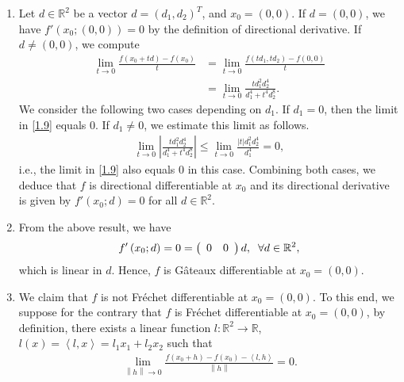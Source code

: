 \documentclass[a4paper]{article}
\numberwithin{equation}{section}
\begin{document}
\begin{enumerate}
\item Let $d\in \mathbb{R}^2$ be a vector $d=\left(d_1,d_2\right)^T$, and $x_0 =\left(0,0\right)$. If $d=\left(0,0\right)$, we have $f'\left( {{x_0};\left( {0,0} \right)} \right) = 0$ by the definition of directional derivative. If $d\ne \left(0,0\right)$, we compute
\begin{align}
\mathop {\lim }\limits_{t \to 0} \frac{{f\left( {{x_0} + td} \right) - f\left( {{x_0}} \right)}}{t} &= \mathop {\lim }\limits_{t \to 0} \frac{{f\left( {t{d_1},t{d_2}} \right) - f\left( {0,0} \right)}}{t}\\
 &= \mathop {\lim }\limits_{t \to 0} \frac{{td_1^2d_2^4}}{{d_1^4 + {t^4}d_2^8}}. \label{1.9}
\end{align}
We consider the following two cases depending on $d_1$. If $d_1=0$, then the limit in \eqref{1.9} equals $0$. If $d_1\ne 0$, we estimate this limit as follows.
\begin{align}
\mathop {\lim }\limits_{t \to 0} \left| {\frac{{td_1^2d_2^4}}{{d_1^4 + {t^4}d_2^8}}} \right| \le \mathop {\lim }\limits_{t \to 0} \frac{{\left| t \right|d_1^2d_2^4}}{{d_1^4}} = 0,
\end{align}
i.e., the limit in \eqref{1.9} also equals $0$ in this case. Combining both cases, we deduce that $f$ is directional differentiable at $x_0$ and its directional derivative is given by $f'\left( {{x_0};d} \right) = 0$ for all $d \in {\mathbb{R} ^2}$. 
\item From the above result, we have
\begin{align}
f'\left( {{x_0};d} \right) = 0 = \left( {\begin{array}{*{20}{c}}
0&0
\end{array}} \right)d ,\hspace{0.2cm} \forall d\in \mathbb{R}^2,
\end{align}
which is linear in $d$. Hence, $f$ is G\^{a}teaux differentiable at $x_0=\left(0,0\right)$. 
\item We claim that $f$ is not Fr\'{e}chet differentiable at $x_0=\left(0,0\right)$. To this end, we suppose for the contrary that $f$ is Fr\'{e}chet differentiable at $x_0=\left(0,0\right)$, by definition, there exists a linear function $l:\mathbb{R}^2\to \mathbb{R}$, $l\left( x \right) = \left\langle {l,x} \right\rangle  = {l_1}{x_1} + {l_2}{x_2}$ such that 
\begin{align}
\label{1.12}
\mathop {\lim }\limits_{\left\| h \right\| \to 0} \frac{{f\left( {{x_0} + h} \right) - f\left( {{x_0}} \right) - \left\langle {l,h} \right\rangle }}{{\left\| h \right\|}} = 0.

\end{align}
\end{enumerate}
\end{document}
